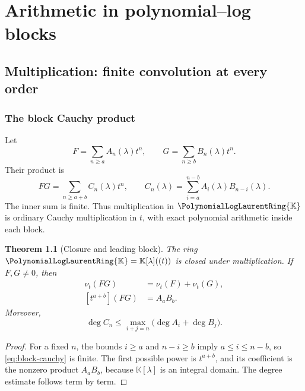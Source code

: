\documentclass[11pt,openany]{book}
\theoremstyle{definition}
\theoremstyle{plain}
\newtheorem{theorem}{Theorem}[chapter]
\theoremstyle{remark}
\newcommand{\K}{\mathbb{K}}
\newcommand{\Plog}{\PolynomialLogLaurentRing{\K}}
\newcommand{\val}{\nu}
\DeclareMathOperator{\polydeg}{deg}
\begin{document}
\part{Arithmetic in polynomial--log blocks}\label{part:arithmetic}

\chapter{Multiplication: finite convolution at every order}\label{ch:multiplication}

\section{The block Cauchy product}
Let
\begin{equation}\label{eq:FG-blocks}
 F=\sum_{n\ge a}A_n(\lambda)t^n,
 \qquad
 G=\sum_{n\ge b}B_n(\lambda)t^n.
\end{equation}
Their product is
\begin{equation}\label{eq:block-cauchy}
 FG=\sum_{n\ge a+b}C_n(\lambda)t^n,
 \qquad
 C_n(\lambda)=\sum_{i=a}^{n-b}A_i(\lambda)B_{n-i}(\lambda).
\end{equation}
The inner sum is finite. Thus multiplication in \(\Plog\) is ordinary Cauchy multiplication in \(t\), with exact polynomial arithmetic inside each block.

\begin{theorem}[Closure and leading block]\label{thm:multiplication}
The ring \(\Plog=\K[\lambda]((t))\) is closed under multiplication. If \(F,G\ne0\), then
\begin{align}
 \val_t(FG)&=\val_t(F)+\val_t(G),\label{eq:val-product}\\
 [t^{a+b}](FG)&=A_aB_b.\label{eq:lead-product}
\end{align}
Moreover,
\begin{equation}\label{eq:degree-bound-product}
 \polydeg C_n\le
 \max_{i+j=n}\bigl(\polydeg A_i+\polydeg B_j\bigr).
\end{equation}
\end{theorem}

\begin{proof}
For a fixed \(n\), the bounds \(i\ge a\) and \(n-i\ge b\) imply \(a\le i\le n-b\), so \cref{eq:block-cauchy} is finite. The first possible power is \(t^{a+b}\), and its coefficient is the nonzero product \(A_aB_b\), because \(\K[\lambda]\) is an integral domain. The degree estimate follows term by term.
\end{proof}
\end{document}
